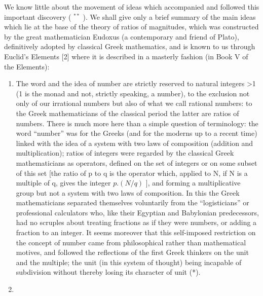 We know little about the movement of ideas which accompanied and followed this important discovery ( \(^{**}\) ). We shall give only a brief summary of the main ideas which lie at the base of the theory of ratios of magnitudes, which was constructed by the great mathematician Eudoxus (a contemporary and friend of Plato), definitively adopted by classical Greek mathematics, and is known to us through Euclid's Elements {[}2{]} where it is described in a masterly fashion (in Book V of the Elements):

\begin{enumerate}
\def\labelenumi{\arabic{enumi})}
\item
  The word and the idea of number are strictly reserved to natural integers \textgreater1 (1 is the monad and not, strictly speaking, a number), to the exclusion not only of our irrational numbers but also of what we call rational numbers: to the Greek mathematicians of the classical period the latter are ratios of numbers. There is much more here than a simple question of terminology: the word ``number'' was for the Greeks (and for the moderns up to a recent time) linked with the idea of a system with two laws of composition (addition and multiplication); ratios of integers were regarded by the classical Greek mathematicians as operators, defined on the set of integers or on some subset of this set {[}the ratio of p to q is the operator which, applied to N, if N is a multiple of q, gives the integer \(p.(N/q)\) {]}, and forming a multiplicative group but not a system with two laws of composition. In this the Greek mathematicians separated themselves voluntarily from the ``logisticians'' or professional calculators who, like their Egyptian and Babylonian predecessors, had no scruples about treating fractions as if they were numbers, or adding a fraction to an integer. It seems moreover that this self-imposed restriction on the concept of number came from philosophical rather than mathematical motives, and followed the reflections of the first Greek thinkers on the unit and the multiple; the unit (in this system of thought) being incapable of subdivision without thereby losing its character of unit (*).
\item

\end{enumerate}
